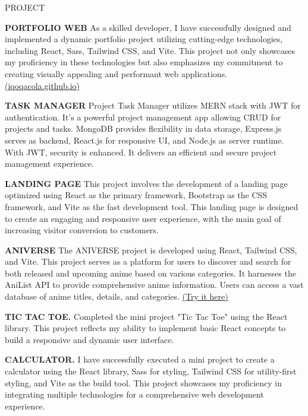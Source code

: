\documentclass{resume} %
\begin{document}

\begin{rSection}{PROJECT}
\vspace{-1.25em}

\item \textbf{PORTFOLIO WEB} {As a skilled developer, I have successfully designed and implemented a dynamic portfolio project utilizing cutting-edge technologies, including React, Sass, Tailwind CSS, and Vite. This project not only showcases my proficiency in these technologies but also emphasizes my commitment to creating visually appealing and performant web applications.  \href{https://iqoqacola.github.io/anime-list/}{(iqoqacola.github.io)}}

\item \textbf{TASK MANAGER} {Project Task Manager utilizes MERN stack with JWT for authentication. It's a powerful project management app allowing CRUD for projects and tasks. MongoDB provides flexibility in data storage, Express.js serves as backend, React.js for responsive UI, and Node.js as server runtime. With JWT, security is enhanced. It delivers an efficient and secure project management experience.}

\item \textbf{LANDING PAGE} {This project involves the development of a landing page optimized using React as the primary framework, Bootstrap as the CSS framework, and Vite as the fast development tool. This landing page is designed to create an engaging and responsive user experience, with the main goal of increasing visitor conversion to customers.}

\item \textbf{ANIVERSE} {The ANIVERSE project is developed using React, Tailwind CSS, and Vite. This project serves as a platform for users to discover and search for both released and upcoming anime based on various categories. It harnesses the AniList API to provide comprehensive anime information. Users can access a vast database of anime titles, details, and categories. \href{https://iqoqacola.github.io/anime-list/}{(Try it here)}}

\item \textbf{TIC TAC TOE.} {Completed the mini project "Tic Tac Toe" using the React library. This project reflects my ability to implement basic React concepts to build a responsive and dynamic user interface.}

\item \textbf{CALCULATOR.} {I have successfully executed a mini project to create a calculator using the React library, Sass for styling, Tailwind CSS for utility-first styling, and Vite as the build tool. This project showcases my proficiency in integrating multiple technologies for a comprehensive web development experience.}

\end{rSection} 
\end{document}
